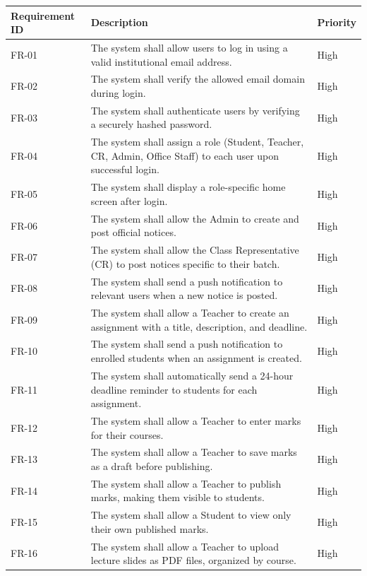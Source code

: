 \documentclass[12pt,a4paper]{article}
\newcommand{\THH}[1]{\small\bfseries\color{white} #1}
\begin{document}
\vspace{0.4em}
\begin{longtable}{|>{\centering\arraybackslash}p{2cm}|p{10cm}|>{\centering\arraybackslash}p{2cm}|}
\hline
\rowcolor{navyblue}
\THH{Requirement ID} & \THH{Description} & \THH{Priority} \\
\hline
\endhead
FR-01 & The system shall allow users to log in using a valid institutional email address. & High \\
FR-02 & The system shall verify the allowed email domain during login. & High \\
FR-03 & The system shall authenticate users by verifying a securely hashed password. & High \\
FR-04 & The system shall assign a role (Student, Teacher, CR, Admin, Office Staff) to each user upon successful login. & High \\
FR-05 & The system shall display a role-specific home screen after login. & High \\
FR-06 & The system shall allow the Admin to create and post official notices. & High \\
FR-07 & The system shall allow the Class Representative (CR) to post notices specific to their batch. & High \\
FR-08 & The system shall send a push notification to relevant users when a new notice is posted. & High \\
FR-09 & The system shall allow a Teacher to create an assignment with a title, description, and deadline. & High \\
FR-10 & The system shall send a push notification to enrolled students when an assignment is created. & High \\
FR-11 & The system shall automatically send a 24-hour deadline reminder to students for each assignment. & High \\
FR-12 & The system shall allow a Teacher to enter marks for their courses. & High \\
FR-13 & The system shall allow a Teacher to save marks as a draft before publishing. & High \\
FR-14 & The system shall allow a Teacher to publish marks, making them visible to students. & High \\
FR-15 & The system shall allow a Student to view only their own published marks. & High \\
FR-16 & The system shall allow a Teacher to upload lecture slides as PDF files, organized by course. & High \\

\end{longtable}
\end{document}
